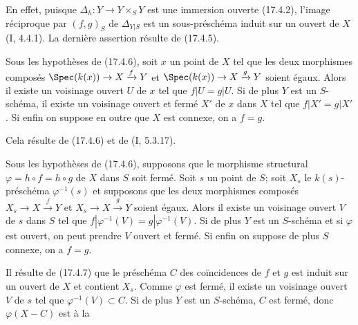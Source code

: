 En effet, puisque $\Delta_h:Y\to Y\times_S Y$ est une immersion ouverte (17.4.2), l'image réciproque par $(f,g)_S$ de $\Delta_{Y|S}$ est un sous-préschéma induit sur un ouvert de $X$ (I, 4.4.1). La dernière assertion résulte de (17.4.5).

\begin{corollary}[17.4.7]
\label{IV.17.4.7}
Sous les hypothèses de (17.4.6), soit $x$ un point de $X$ tel que les deux morphismes composés $\Spec(k(x))\to X\xrightarrow{f}Y$ et $\Spec(k(x))\to X\xrightarrow{g}Y$ soient égaux. Alors il existe un voisinage ouvert $U$ de $x$ tel que $f|U=g|U$. Si de plus $Y$ est un $S$-schéma, il existe un voisinage ouvert et fermé $X'$ de $x$ dans $X$ tel que $f|X'=g|X'$. Si enfin on suppose en outre que $X$ est connexe, on a $f=g$.
\end{corollary}

Cela résulte de (17.4.6) et de (I, 5.3.17).

\begin{corollary}[17.4.8]
\label{IV.17.4.8}
Sous les hypothèses de (17.4.6), supposons que le morphisme structural $\varphi=h\circ f=h\circ g$ de $X$ dans $S$ soit fermé. Soit $s$ un point de $S$; soit $X_s$ le $k(s)$-préschéma $\varphi^{-1}(s)$ et supposons que les deux morphismes composés $X_s\to X\xrightarrow{f}Y$ et $X_s\to X\xrightarrow{g}Y$ soient égaux. Alors il existe un voisinage ouvert $V$ de $s$ dans $S$ tel que $f|\varphi^{-1}(V)=g|\varphi^{-1}(V)$. Si de plus $Y$ est un $S$-schéma et si $\varphi$ est ouvert, on peut prendre $V$ ouvert et fermé. Si enfin on suppose de plus $S$ connexe, on a $f=g$.
\end{corollary}

Il résulte de (17.4.7) que le préschéma $C$ des coïncidences de $f$ et $g$ est induit sur un ouvert de $X$ et contient $X_s$. Comme $\varphi$ est fermé, il existe un voisinage ouvert $V$ de $s$ tel que $\varphi^{-1}(V)\subset C$. Si de plus $Y$ est un $S$-schéma, $C$ est fermé, donc $\varphi(X-C)$ est à la

